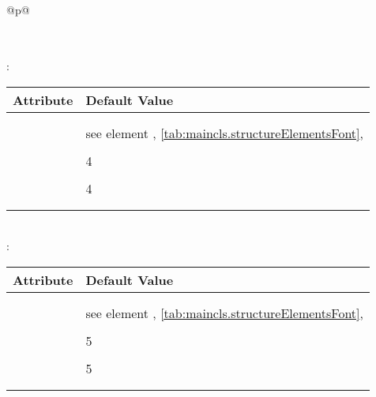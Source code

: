 \begin{longtable}{@{}p{\columnwidth}@{}}
\begin{tabularx}{\linewidth}{ll}
    \PValue{tocstyle}    & \PValue{section} \\
    \bottomrule
    \end{tabularx} \\
    \addlinespace[\normalbaselineskip]
    : \\*
    \begin{tabularx}{\linewidth}{ll}
    \toprule
    Attribute & Default Value \\
    \midrule\nopagebreak
    \PValue{afterskip}   & \PValue{-1em} \\
    \PValue{beforeskip}  & \PValue{3.25ex plus 1ex minus .2ex} \\
    \PValue{font}        & see element \DescRef{maincls.fontelement.paragraph},
                           \autoref{tab:maincls.structureElementsFont}, 
                           \autopageref{tab:maincls.structureElementsFont} \\
    \PValue{indent}      & \PValue{0pt} \\
    \PValue{level}       & 4 \\
    \PValue{tocindent}   & \PValue{10em}\\
    \PValue{toclevel}    & 4 \\
    \PValue{tocnumwidth} & \PValue{5em}\\
    \PValue{tocstyle}    & \PValue{section} \\
    \bottomrule
    \end{tabularx} \\
    \addlinespace[\normalbaselineskip]
    :  \\*
    \begin{tabularx}{\linewidth}{ll}
    \toprule
    Attribute & Default Value \\
    \midrule\nopagebreak
    \PValue{afterskip}   & \PValue{-1em} \\
    \PValue{beforeskip}  & \PValue{3.25ex plus 1ex minus .2ex} \\
    \PValue{font}        & see element
                           \DescRef{maincls.fontelement.subparagraph},
                           \autoref{tab:maincls.structureElementsFont}, 
                           \autopageref{tab:maincls.structureElementsFont} \\
    \PValue{indent}      & \Macro{scr@parindent} \\
    \PValue{level}       & 5 \\
    \PValue{tocindent}   & \PValue{12em}\\
    \PValue{toclevel}    & 5 \\
    \PValue{tocnumwidth} & \PValue{6em}\\
    \PValue{tocstyle}    & \PValue{section} \\
    \bottomrule
    \end{tabularx}
  \end{longtable}
%
\EndIndexGroup


